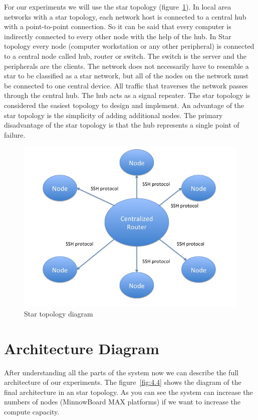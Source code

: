 For our experiments we will use the star topology (figure~\ref{fig:4.3}). In
local area networks with a star topology, each network host is connected to a
central hub with a point-to-point connection. So it can be said that every
computer is indirectly connected to every other node with the help of the hub.
In Star topology every node (computer workstation or any other peripheral) is
connected to a central node called hub, router or switch. The switch is the
server and the peripherals are the clients. The network does not necessarily
have to resemble a star to be classified as a star network, but all of the
nodes on the network must be connected to one central device. All traffic that
traverses the network passes through the central hub. The hub acts as a signal
repeater. The star topology is considered the easiest topology to design and
implement. An advantage of the star topology is the simplicity of adding
additional nodes. The primary disadvantage of the star topology is that the hub
represents a single point of failure.

\begin{figure}[H]
\centering
\includegraphics[width=1\textwidth]{images/star_topology.png}
\caption{Star topology diagram}
\label{fig:4.3}
\end{figure}


\section{Architecture Diagram}

After understanding all the parts of the system now we can describe the full
architecture of our experiments. The figure~\ref{fig:4.4} shows the diagram of
the final architecture in an star topology. As you can see the system can
increase the numbers of nodes (MinnowBoard MAX platforms) if we want to increase
the compute capacity.


